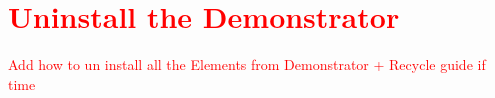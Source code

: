 \chapter{\textcolor{red}{Uninstall the Demonstrator}}
\textcolor{red}{ Add how to un install all the Elements from Demonstrator + Recycle guide if time}